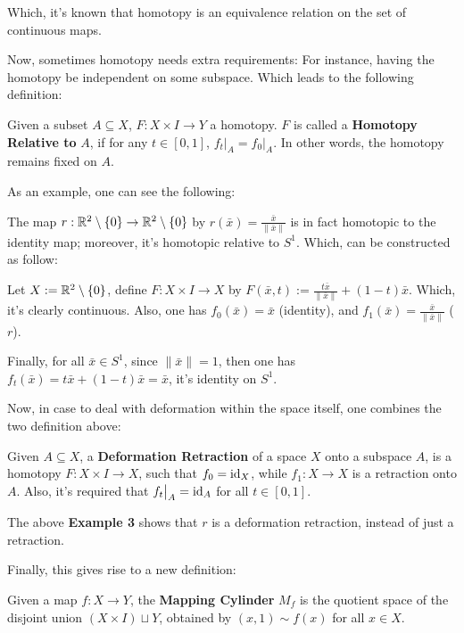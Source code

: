 \documentclass{article}
\begin{document}
Which, it's known that homotopy is an equivalence relation on the set of continuous maps.

\hfil

Now, sometimes homotopy needs extra requirements: For instance, having the homotopy be independent on some subspace. Which leads to the following definition:
\begin{defn}[]
    Given a subset $A\subseteq X$, $F:X\times I\rightarrow Y$ a homotopy. $F$ is called a \textbf{Homotopy Relative to } $A$, if for any $t\in[0,1]$, $f_t\big|_A = f_0\big|_A$.  In other words, the homotopy remains fixed on $A$.
\end{defn}

As an example, one can see the following:

\begin{exm}
    The map $r:\mathbb{R}^2\setminus\{0\}\rightarrow\mathbb{R}^2\setminus\{0\}$ by $r(\bar{x}) = \frac{\bar{x}}{\|\bar{x}\|}$ is in fact homotopic to the identity map; moreover, it's homotopic relative to $S^1$. Which, can be constructed as follow:

    Let $X:= \mathbb{R}^2\setminus\{0\}$, define $F:X\times I\rightarrow X$ by $F(\bar{x}, t):= \frac{t\bar{x}}{\|\bar{x}\|} + (1-t)\bar{x}$. Which, it's clearly continuous. Also, one has $f_0(\bar{x}) = \bar{x}$ (identity), and $f_1(\bar{x}) = \frac{\bar{x}}{\|\bar{x}\|}$ ($r$). 
    
    Finally, for all $\bar{x}\in S^1$, since $\|\bar{x}\|=1$, then one has $f_t(\bar{x}) = t\bar{x} + (1-t)\bar{x} = \bar{x}$, it's identity on $S^1$.
\end{exm}

\hfil

Now, in case to deal with deformation within the space itself, one combines the two definition above:
\begin{defn}
    Given $A\subseteq X$, a \textbf{Deformation Retraction} of a space $X$ onto a subspace $A$, is a homotopy $F:X\times I\rightarrow X$, such that $f_0 = \mathrm{id}_X$, while $f_1:X\rightarrow X$ is a retraction onto $A$. Also, it's required that $f_t\big|_A = \mathrm{id}_A$ for all $t\in[0,1]$.
\end{defn}

The above \textbf{Example 3} shows that $r$ is a deformation retraction, instead of just a retraction.

Finally, this gives rise to a new definition:
\begin{defn}
    Given a map $f:X \rightarrow Y$, the \textbf{Mapping Cylinder} $M_f$ is the quotient space of the disjoint union $(X\times I)\sqcup Y$, obtained by $(x,1) \sim f(x)$ for all $x\in X$.
\end{defn}
\end{document}
